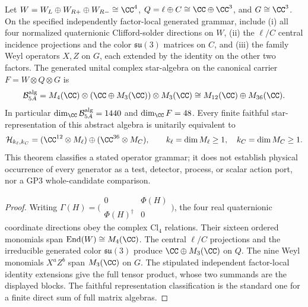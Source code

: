 \documentclass[12pt,a4paper]{article}
\begin{document}
\begin{theorem}
\label{p5:thm:v329-matter-factor-envelope}
Let $W=W_L\oplus W_{R+}\oplus W_{R-}\cong\CC^4$,
$Q=\ell\oplus C\cong\CC\oplus\CC^3$, and $G\cong\CC^3$.
On the specified independently factor-local generated grammar, include
(i) all four normalized quaternionic Clifford-solder directions on $W$,
(ii) the $\ell/C$ central incidence projections and the color
$\mathfrak{su}(3)$ matrices on $C$, and (iii) the family Weyl operators
$X,Z$ on $G$, each extended by the identity on the other two factors.
The generated unital complex star-algebra on the canonical carrier
$F=W\otimes Q\otimes G$ is
\[
 \mathcal B_{5A}^{\mathrm{alg}}
 =M_4(\CC)\otimes(\CC\oplus M_3(\CC))\otimes M_3(\CC)
 \cong M_{12}(\CC)\oplus M_{36}(\CC).
\]
In particular $\dim_\CC\mathcal B_{5A}^{\mathrm{alg}}=1440$ and
$\dim_\CC F=48$. Every finite faithful star-representation of this
abstract algebra is unitarily equivalent to
\[
 \mathcal H_{k_\ell,k_C}
 =(\CC^{12}\otimes M_\ell)\oplus
   (\CC^{36}\otimes M_C),
 \qquad k_\ell=\dim M_\ell\ge1,\quad k_C=\dim M_C\ge1.
\]
This theorem classifies a stated operator grammar; it does not establish
physical occurrence of every generator as a test, detector, process, or
scalar action port, nor a GP3 whole-candidate comparison.
\end{theorem}
\begin{proof}
Writing $\Gamma(H)=\bigl(\begin{smallmatrix}
 0&\Phi(H)\\ \Phi(H)^\dagger&0
\end{smallmatrix}\bigr)$, the four real quaternionic coordinate
directions obey the complex $\mathrm{Cl}_4$ relations. Their sixteen
ordered monomials span $\operatorname{End}(W)\cong M_4(\CC)$.
The central $\ell/C$ projections and the irreducible generated color
$\mathfrak{su}(3)$ produce $\CC\oplus M_3(\CC)$ on $Q$.
The nine Weyl monomials $X^aZ^b$ span $M_3(\CC)$ on $G$.
The stipulated independent factor-local identity extensions give the
full tensor product, whose two summands are the displayed blocks.
The faithful representation classification is the standard one for
a finite direct sum of full matrix algebras.
\end{proof}
\end{document}
